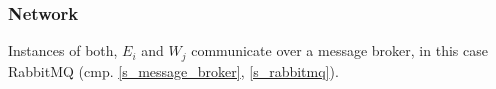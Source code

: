 \subsubsection{Network}

Instances of both, $E_i$ and $W_j$ communicate over a
message broker, in this case RabbitMQ (cmp.
\ref{s_message_broker}, \ref{s_rabbitmq}).


